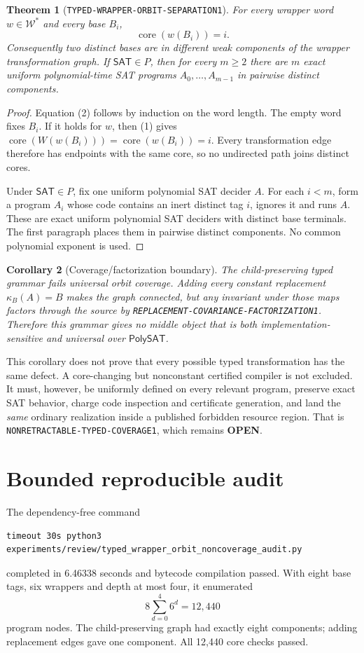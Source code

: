 \documentclass[11pt]{article}
\newtheorem{theorem}{Theorem}
\newtheorem{corollary}[theorem]{Corollary}
\newcommand{\SAT}{\mathsf{SAT}}
\newcommand{\PolySAT}{\mathsf{PolySAT}}
\newcommand{\OPEN}{\textbf{OPEN}}
\begin{document}
\begin{theorem}[\texttt{TYPED-WRAPPER-ORBIT-SEPARATION1}]
For every wrapper word \(w\in\mathcal W^*\) and every base \(B_i\),
\[
 \operatorname{core}(w(B_i))=i.
 \tag{2}
\]
Consequently two distinct bases are in different weak components of the
wrapper transformation graph.  If \(\SAT\in P\), then for every \(m\ge2\)
there are \(m\) exact uniform polynomial-time SAT programs
\(A_0,\ldots,A_{m-1}\) in pairwise distinct components.
\end{theorem}

\begin{proof}
Equation (2) follows by induction on the word length.  The empty word fixes
\(B_i\).  If it holds for \(w\), then (1) gives
\(\operatorname{core}(W(w(B_i)))=\operatorname{core}(w(B_i))=i\).
Every transformation edge therefore has endpoints with the same core, so no
undirected path joins distinct cores.

Under \(\SAT\in P\), fix one uniform polynomial SAT decider \(A\).  For each
\(i<m\), form a program \(A_i\) whose code contains an inert distinct tag
\(i\), ignores it and runs \(A\).  These are exact uniform polynomial SAT
deciders with distinct base terminals.  The first paragraph places them in
pairwise distinct components.  No common polynomial exponent is used.
\end{proof}

\begin{corollary}[Coverage/factorization boundary]
The child-preserving typed grammar fails universal orbit coverage.  Adding
every constant replacement \(\kappa_B(A)=B\) makes the graph connected, but
any invariant under those maps factors through the source by
\texttt{REPLACEMENT-COVARIANCE-FACTORIZATION1}.  Therefore this grammar gives
no middle object that is both implementation-sensitive and universal over
\(\PolySAT\).
\end{corollary}

This corollary does not prove that every possible typed transformation has
the same defect.  A core-changing but nonconstant certified compiler is not
excluded.  It must, however, be uniformly defined on every relevant program,
preserve exact SAT behavior, charge code inspection and certificate
generation, and land the \emph{same} ordinary realization inside a published
forbidden resource region.  That is \texttt{NONRETRACTABLE-TYPED-COVERAGE1},
which remains \OPEN.

\section{Bounded reproducible audit}
The dependency-free command
\begin{verbatim}
timeout 30s python3 experiments/review/typed_wrapper_orbit_noncoverage_audit.py
\end{verbatim}
completed in 6.46338 seconds and bytecode compilation passed.  With eight
base tags, six wrappers and depth at most four, it enumerated
\[
 8\sum_{d=0}^{4}6^d=12{,}440
\]
program nodes.  The child-preserving graph had exactly eight components;
adding replacement edges gave one component.  All 12,440 core checks passed.
\end{document}
